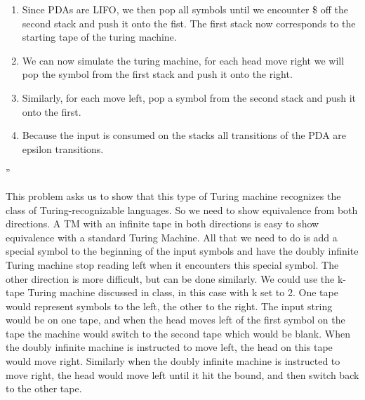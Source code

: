 \begin{problem}{5}
\begin{solution}
\begin{itemize}
\begin{enumerate}
          \item Since PDAs are LIFO, we then pop all symbols until we encounter \$ off the second stack and push it onto the fist.  The first stack now corresponds to the starting tape of the turing machine. \\
          \item We can now simulate the turing machine, for each head move right we will pop the symbol from the first stack and push it onto the right. \\
          \item Similarly, for each move left, pop a symbol from the second stack and push it onto the first. \\
          \item Because the input is consumed on the stacks all transitions of the PDA are epsilon transitions.
        \end{enumerate}
      ''
    \end{itemize}
  \end{solution}
\end{problem}

\begin{problem}{6}
  \begin{solution}
    This problem asks us to show that this type of Turing machine recognizes the class of Turing-recognizable languages.
    So we need to show equivalence from both directions.
    \br
    A TM with an infinite tape in both directions is easy to show equivalence with a standard Turing Machine.  All that
    we need to do is add a special symbol to the beginning of the input symbols and have the doubly infinite Turing
    machine stop reading left when it encounters this special symbol.
    \br
    The other direction is more difficult, but can be done similarly.  We could use the k-tape Turing machine discussed
    in class, in this case with k set to 2.  One tape would represent symbols to the left, the other to the right. The
    input string would be on one tape, and when the head moves left of the first symbol on the tape the machine would
    switch to the second tape which would be blank. When the doubly infinite machine is instructed to move left, the
    head on this tape would move right.  Similarly when the doubly infinite machine is instructed to move right, the
    head would move left until it hit the bound, and then switch back to the other tape.
  \end{solution}
\end{problem}

